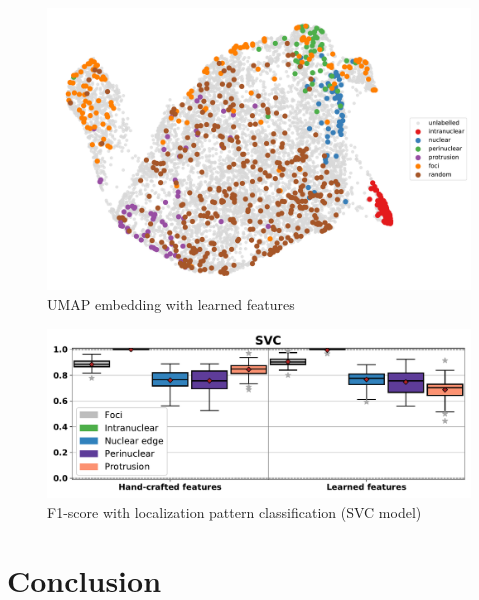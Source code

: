 \begin{figure}[h]
    \centering
    \includegraphics[width=1\textwidth]{figures/chapter4/umap_real}
    \caption{UMAP embedding with learned features}
    \label{fig:umap_real}
\end{figure}

\begin{figure}[h]
    \centering
    \includegraphics[width=1\textwidth]{figures/chapter4/f1_SVC}
    \caption{F1-score with localization pattern classification (SVC model)}
    \label{fig:f1_SVC_real}
\end{figure}


\section{Conclusion} \label{sec:analysis_conclusion}

